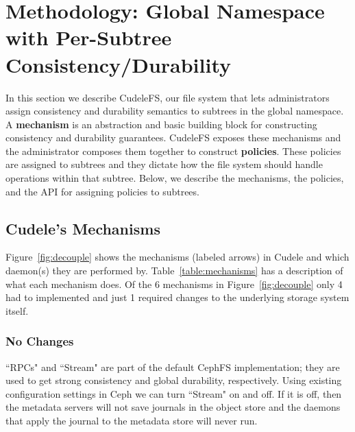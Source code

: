\section{Methodology: Global Namespace with Per-Subtree Consistency/Durability}
\label{sec:methodology-decoupled-namespaces}

In this section we describe CudeleFS, our file system that lets administrators
assign consistency and durability semantics to subtrees in the global
namespace. A \textbf{mechanism} is an abstraction and basic building block for
constructing consistency and durability guarantees. CudeleFS exposes these
mechanisms and the administrator composes them together to construct
\textbf{policies}. These policies are assigned to subtrees and they dictate how
the file system should handle operations within that subtree.  Below, we
describe the mechanisms, the policies, and the API for assigning policies to
subtrees.

\subsection{Cudele's Mechanisms}
\label{sec:cudeles-mechanisms}

Figure~\ref{fig:decouple} shows the mechanisms (labeled arrows) in Cudele and
which daemon(s) they are performed by.  Table~\ref{table:mechanisms} has a
description of what each mechanism does.  Of the 6 mechanisms in
Figure~\ref{fig:decouple} only 4 had to implemented and just 1 required changes to
the underlying storage system itself.  

\subsubsection{No Changes} ``RPCs" and ``Stream" are part of the default CephFS
implementation; they are used to get strong consistency and global durability,
respectively.  Using existing configuration settings in Ceph we can turn
``Stream" on and off.  If it is off, then the metadata servers will not save
journals in the object store and the daemons that apply the journal to the
metadata store will never run. 

